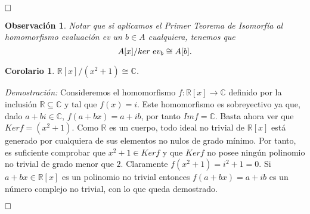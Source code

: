 \documentclass[12pt]{article}
\newtheorem{corolario}{Corolario}[theorem]
\newtheorem{observation}{Observación}[theorem]
\begin{document}
$\hfill \square$

\begin{observation}Notar que si aplicamos el \textit{Primer Teorema de Isomorfía} al homomorfismo evaluación ev un $b \in A$ cualquiera, tenemos que $$A[x]/ker \hspace{0.1cm} ev_b \cong A[b].$$
\end{observation}

\begin{corolario}$\mathbb{R}[x]/(x^2+1) \cong \mathbb{C}$.
\end{corolario}
\emph{Demostración: }Consideremos el homomorfismo $f \colon \mathbb{R}[x] \longrightarrow \mathbb{C}$ definido por la inclusión $\mathbb{R} \subseteq \mathbb{C}$ y tal que $f(x) = i$. Este homomorfismo es sobreyectivo ya que, dado $a+bi \in \mathbb{C}$, $f(a+bx)=a+ib$, por tanto $Imf = \mathbb{C}$. Basta ahora ver que $Kerf =(x^2+1)$. Como $\mathbb{R}$ es un cuerpo, todo ideal no trivial de $\mathbb{R}[x]$ está generado por cualquiera de sus elementos no nulos de grado mínimo. Por tanto, es suficiente comprobar que $x^2+1 \in Kerf$ y que $Ker f$ no posee ningún polinomio no trivial de grado menor que $2$. Claramente $f(x^2+1)=i^2+1 = 0$. Si $a+bx \in \mathbb{R}[x]$ es un polinomio no trivial entonces $f(a+bx) = a+ib$ es un número complejo no trivial, con lo que queda demostrado.

$\hfill \square$
\end{document}
